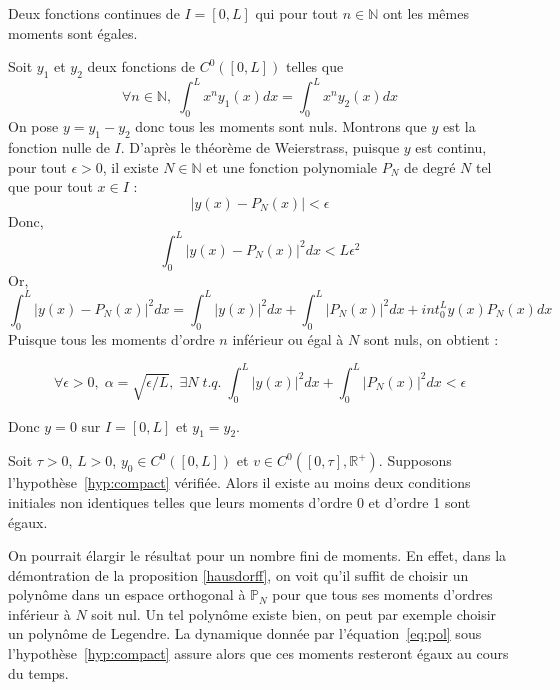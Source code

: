 \documentclass[a4paper]{article}
\begin{document}
\begin{proposition}
	\label{hausdorff}
	Deux fonctions continues de $I=[0,L]$ qui pour tout $n \in \mathbb{N}$ ont les mêmes moments sont égales. 
\end{proposition}

\begin{preuve}
	Soit $y_1$ et $y_2$ deux fonctions de $C^0([0,L])$ telles que 
	\[\forall n \in \mathbb{N}, \; \int_0^L x^n y_1(x)dx = \int_0^L x^n y_2(x)dx \]
	On pose $y=y_1 - y_2$ donc tous les moments sont nuls. Montrons que $y$ est la fonction nulle de $I$.
	D'après le théorème de Weierstrass, puisque $y$ est continu, pour tout $\epsilon>0$, il existe $N \in \mathbb{N}$ et une fonction polynomiale $P_N$ de degré $N$ tel que pour tout $x \in I$ :
	\[ |y(x) - P_N(x)| < \epsilon \]
	Donc,
	\[ \int_0^L |y(x) - P_N(x)|^2 dx < L \epsilon^2 \]
	Or,
	\[ \int_0^L |y(x) - P_N(x)|^2 dx = \int_0^L |y(x)|^2 dx  + \int_0^L |P_N(x)|^2 dx 
	                                   + int_0^L y(x)P_N(x)dx \]
 Puisque tous les moments d'ordre $n$ inférieur ou égal à $N$ sont nuls, on obtient :
 
 \[ \forall \epsilon>0, \; \alpha = \sqrt{\epsilon/L}  , \; \exists N \; t.q. \; \int_0^L |y(x)|^2 dx  + \int_0^L |P_N(x)|^2 dx <\epsilon \]
 
 Donc $y =0$ sur $I=[0,L]$ et $y_1=y_2$.

\end{preuve}

\begin{proposition}
	Soit $\tau >0$, $L>0$, $y_0 \in C^0([0,L])$ et $v \in C^0([0,\tau],\mathbb{R}^+)$.
	Supposons l'hypothèse~\eqref{hyp:compact} vérifiée.
	Alors il existe au moins deux conditions initiales non identiques telles que leurs moments d'ordre 0 et d'ordre 1 sont égaux. 
\end{proposition}

\begin{remarque}
	On pourrait élargir le résultat pour un nombre fini de moments. En effet, dans la démontration de la proposition \ref{hausdorff}, on voit qu'il suffit de choisir un polynôme dans un espace orthogonal à $\mathbb{P}_N$ pour que tous ses moments d'ordres inférieur à $N$ soit nul. Un tel polynôme existe bien, on peut par exemple choisir un polynôme de Legendre. La dynamique donnée par l'équation~\eqref{eq:pol} sous l'hypothèse~\eqref{hyp:compact} assure alors que ces moments resteront égaux au cours du temps.
\end{remarque}
\end{document}
